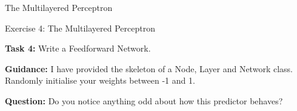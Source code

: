 \documentclass[]{SangerLibrary/sanger-present}
\renewcommand\vec[1]{\boldsymbol{\mathbf{#1}}}
\begin{document}
{\begin{frame}{The Multilayered Perceptron}
	\end{frame}
	}

	\begin{frame}{Exercise 4: The Multilayered Perceptron}
	

		\textbf{Task 4:} Write a Feedforward Network.

		\vspace{1cm}

		\pause \textbf{Guidance:} I have provided the skeleton of a Node, Layer and Network class. Randomly initialise your weights between -1 and 1.
			
		\vspace{1cm}

		\pause \textbf{Question:}  Do you notice anything odd about how this predictor behaves?
	\end{frame}
\end{document}

